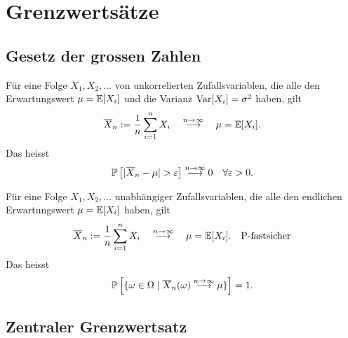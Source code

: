 


\section{Grenzwertsätze}




\subsection{Gesetz der grossen Zahlen}

\begin{theorem}
	Für eine Folge \(X_1,X_2,\ldots\) von unkorrelierten Zufallsvariablen, die alle den
	Erwartungswert \(\mu = \E[X_i]\) und die Varianz \(\var[X_i] = \sigma^2\) haben, gilt
	\[
		\overline{X}_n := \frac{1}{n} \sum_{i=1}^n X_i
		\quad\overset{n\rightarrow\infty}{\longrightarrow}\quad
		\mu = \E[X_i].
	\]
	Das heisst
	\[
		\P\left[\lvert\overline{X}_n-\mu\rvert > \epsilon \right] \overset{n\rightarrow\infty}{\longrightarrow} 0
		\quad \forall \epsilon > 0.
	\]
\end{theorem}

\begin{theorem}
	Für eine Folge \(X_1,X_2,\ldots\) unabhängiger Zufallsvariablen, die alle den
	endlichen Erwartungswert \(\mu = \E[X_i]\) haben, gilt
	\[
		\overline{X}_n := \frac{1}{n} \sum_{i=1}^n X_i
		\quad\overset{n\rightarrow\infty}{\longrightarrow}\quad
		\mu = \E[X_i].
		\quad\text{P-fastsicher}
	\]
	Das heisst
	\[
		\P\left[\{\omega \in \Omega \mid \overline{X}_n(\omega) \overset{n\rightarrow\infty}{\longrightarrow} \mu\}\right] = 1.
	\]
\end{theorem}




\subsection{Zentraler Grenzwertsatz}

